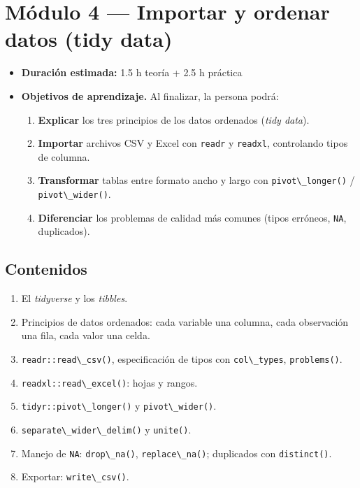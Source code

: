 \chapter{Módulo 4 --- Importar y ordenar datos (tidy data)}

\begin{itemize}
\tightlist
\item
  \textbf{Duración estimada:} 1.5 h teoría + 2.5 h práctica
\item
  \textbf{Objetivos de aprendizaje.} Al finalizar, la persona podrá:

  \begin{enumerate}
  \def\labelenumi{\arabic{enumi}.}
  \tightlist
  \item
    \textbf{Explicar} los tres principios de los datos ordenados
    (\emph{tidy data}).
  \item
    \textbf{Importar} archivos CSV y Excel con
    \passthrough{\lstinline!readr!} y \passthrough{\lstinline!readxl!},
    controlando tipos de columna.
  \item
    \textbf{Transformar} tablas entre formato ancho y largo con
    \passthrough{\lstinline!pivot\_longer()!} /
    \passthrough{\lstinline!pivot\_wider()!}.
  \item
    \textbf{Diferenciar} los problemas de calidad más comunes (tipos
    erróneos, \passthrough{\lstinline!NA!}, duplicados).
  \end{enumerate}
\end{itemize}

\section{Contenidos}

\begin{enumerate}
\def\labelenumi{\arabic{enumi}.}
\tightlist
\item
  El \emph{tidyverse} y los \emph{tibbles}.
\item
  Principios de datos ordenados: cada variable una columna, cada
  observación una fila, cada valor una celda.
\item
  \passthrough{\lstinline!readr::read\_csv()!}, especificación de tipos
  con \passthrough{\lstinline!col\_types!},
  \passthrough{\lstinline!problems()!}.
\item
  \passthrough{\lstinline!readxl::read\_excel()!}: hojas y rangos.
\item
  \passthrough{\lstinline!tidyr::pivot\_longer()!} y
  \passthrough{\lstinline!pivot\_wider()!}.
\item
  \passthrough{\lstinline!separate\_wider\_delim()!} y
  \passthrough{\lstinline!unite()!}.
\item
  Manejo de \passthrough{\lstinline!NA!}:
  \passthrough{\lstinline!drop\_na()!},
  \passthrough{\lstinline!replace\_na()!}; duplicados con
  \passthrough{\lstinline!distinct()!}.
\item
  Exportar: \passthrough{\lstinline!write\_csv()!}.
\end{enumerate}

